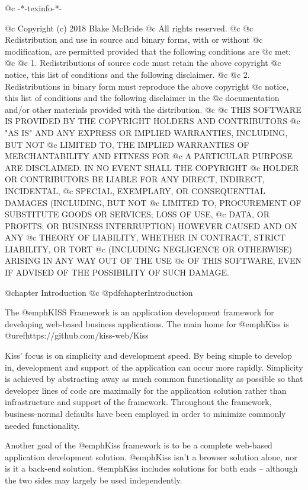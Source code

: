 @c -*-texinfo-*-

@c  Copyright (c) 2018 Blake McBride
@c  All rights reserved.
@c
@c  Redistribution and use in source and binary forms, with or without
@c  modification, are permitted provided that the following conditions are
@c  met:
@c
@c  1. Redistributions of source code must retain the above copyright
@c  notice, this list of conditions and the following disclaimer.
@c
@c  2. Redistributions in binary form must reproduce the above copyright
@c  notice, this list of conditions and the following disclaimer in the
@c  documentation and/or other materials provided with the distribution.
@c
@c  THIS SOFTWARE IS PROVIDED BY THE COPYRIGHT HOLDERS AND CONTRIBUTORS
@c  "AS IS" AND ANY EXPRESS OR IMPLIED WARRANTIES, INCLUDING, BUT NOT
@c  LIMITED TO, THE IMPLIED WARRANTIES OF MERCHANTABILITY AND FITNESS FOR
@c  A PARTICULAR PURPOSE ARE DISCLAIMED. IN NO EVENT SHALL THE COPYRIGHT
@c  HOLDER OR CONTRIBUTORS BE LIABLE FOR ANY DIRECT, INDIRECT, INCIDENTAL,
@c  SPECIAL, EXEMPLARY, OR CONSEQUENTIAL DAMAGES (INCLUDING, BUT NOT
@c  LIMITED TO, PROCUREMENT OF SUBSTITUTE GOODS OR SERVICES; LOSS OF USE,
@c  DATA, OR PROFITS; OR BUSINESS INTERRUPTION) HOWEVER CAUSED AND ON ANY
@c  THEORY OF LIABILITY, WHETHER IN CONTRACT, STRICT LIABILITY, OR TORT
@c  (INCLUDING NEGLIGENCE OR OTHERWISE) ARISING IN ANY WAY OUT OF THE USE
@c  OF THIS SOFTWARE, EVEN IF ADVISED OF THE POSSIBILITY OF SUCH DAMAGE.


@chapter Introduction
@c @pdfchapter{Introduction}

The @emph{KISS Framework} is an application development framework for
developing web-based business applications.  The main home for @emph{Kiss}
is @uref{https://github.com/kiss-web/Kiss}


Kiss' focus is on
simplicity and development speed.  By being simple to develop in,
development and support of the application can occur more rapidly.
Simplicity is achieved by abstracting away as much common
functionality as possible so that developer lines of code are
maximally for the application solution rather than infrastructure and
support of the framework.  Throughout the framework, business-normal
defaults have been employed in order to minimize commonly needed
functionality.

Another goal of the @emph{Kiss} framework is to be a complete web-based
application development solution.  @emph{Kiss} isn't a browser solution
alone, nor is it a back-end solution.  @emph{Kiss} includes solutions for
both ends -- although the two sides may largely be used independently.

